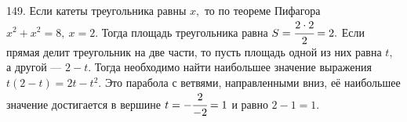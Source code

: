 149. Если катеты треугольника равны $x,$ то по теореме Пифагора $x^2+x^2=8,\ x=2.$ Тогда площадь треугольника равна $S=\cfrac{2\cdot2}{2}=2.$ Если прямая делит треугольник на две части, то пусть площадь одной из них равна $t,$ а другой --- $2-t.$ Тогда необходимо найти наибольшее значение выражения $t(2-t)=2t-t^2.$ Это парабола с ветвями, направленными вниз, её наибольшее значение достигается в вершине $t=-\cfrac{2}{-2}=1$ и равно $2-1=1.$\\
